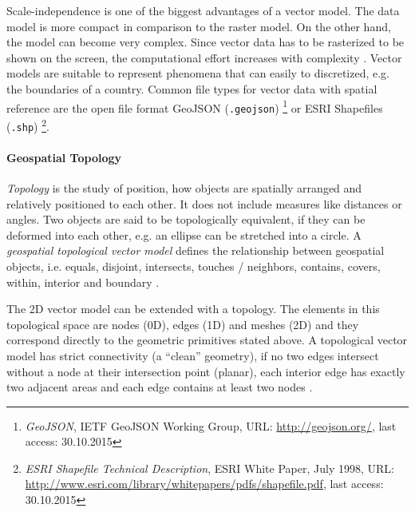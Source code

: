 Scale-independence is one of the biggest advantages of a vector model. The data model is more compact in comparison to the raster model. On the other hand, the model can become very complex. Since vector data has to be rasterized to be shown on the screen, the computational effort increases with complexity \cite[pp.33-42]{bolstad2008gis}.
Vector models are suitable to represent phenomena that can easily to discretized, e.g. the boundaries of a country. Common file types for vector data with spatial reference are the open file format GeoJSON (\texttt{.geojson})
\footnote{
  \textit{GeoJSON},
  IETF GeoJSON Working Group,
  URL: \url{http://geojson.org/},
  last access: 30.10.2015
}
or ESRI Shapefiles (\texttt{.shp})
\footnote{
  \textit{ESRI Shapefile Technical Description},
  ESRI White Paper, July 1998,
  URL: \url{http://www.esri.com/library/whitepapers/pdfs/shapefile.pdf},
  last access: 30.10.2015
}.



\paragraph{Geospatial Topology} %
\label{par:geospatial_topology}

\emph{Topology} is the study of position, how objects are spatially arranged and relatively positioned to each other. It does not include measures like distances or angles. Two objects are said to be topologically equivalent, if they can be deformed into each other, e.g. an ellipse can be stretched into a circle. A \emph{geospatial topological vector model} defines the relationship between geospatial objects, i.e. equals, disjoint, intersects, touches / neighbors, contains, covers, within, interior and boundary
\cite{clementiniTopology}.

The 2D vector model can be extended with a topology. The elements in this topological space are nodes (0D), edges (1D) and meshes (2D) and they correspond directly to the geometric primitives stated above. A topological vector model has strict connectivity (a ``clean'' geometry), if no two edges intersect without a node at their intersection point (planar), each interior edge has exactly two adjacent areas and each edge contains at least two nodes
\cite[pp.37-39]{bolstad2008gis}.

